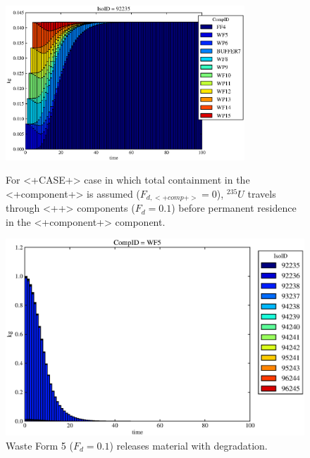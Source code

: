 \begin{figure}[ht]
\centering
\includegraphics[width=0.8\textwidth]{./chapters/demonstration/no_release/mcIII.eps}
\caption[$^{235}U$ residence. Mixed Cell Coupled Sorption and Solubility Limitation.]{
For <+CASE+> case in which total containment in the <+component+> is assumed 
($F_{d,<+comp+>}=0$), $^{235}U$ travels through <++> components ($F_d = 0.1$) before 
permanent residence in the <+component+> component.
}
\label{fig:mcIIIall}
\begin{minipage}[b]{0.45\linewidth}

  \includegraphics[width=\textwidth]{./chapters/demonstration/no_release/mcIII1.eps}
  \caption[MCI Waste Form Contaminants.]{
    Waste Form 5 ($F_d = 0.1$) releases material with degradation. 
    }
  \label{fig:mcIIIwf5}
  

\end{minipage}
\end{figure}
